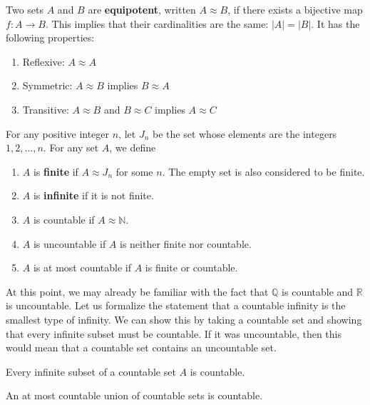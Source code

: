 \documentclass{article}
\begin{document}
    \begin{definition}[Equipotence]
    Two sets $A$ and $B$ are \textbf{equipotent}, written $A \approx B$, if there exists a bijective map $f: A \rightarrow B$. This implies that their cardinalities are the same: $|A| = |B|$. It has the following properties: 
    \begin{enumerate}
        \item Reflexive: $A \approx A$
        \item Symmetric: $A \approx B$ implies $B \approx A$
        \item Transitive: $A \approx B$ and $B \approx C$ implies $A \approx C$
    \end{enumerate}
    \end{definition}

    \begin{definition}
    For any positive integer $n$, let $J_n$ be the set whose elements are the integers $1, 2, \ldots, n$. For any set $A$, we define 
    \begin{enumerate}
        \item $A$ is \textbf{finite} if $A \approx J_n$ for some $n$. The empty set is also considered to be finite. 
        \item $A$ is \textbf{infinite} if it is not finite. 
        \item $A$ is countable if $A \approx \mathbb{N}$. 
        \item $A$ is uncountable if $A$ is neither finite nor countable. 
        \item $A$ is at most countable if $A$ is finite or countable. 
    \end{enumerate}
    \end{definition}

    At this point, we may already be familiar with the fact that $\mathbb{Q}$ is countable and $\mathbb{R}$ is uncountable. Let us formalize the statement that a countable infinity is the smallest type of infinity. We can show this by taking a countable set and showing that every infinite subset must be countable. If it was uncountable, then this would mean that a countable set contains an uncountable set. 

    \begin{theorem}
    \label{countable smallest}
    Every infinite subset of a countable set $A$ is countable. 
    \end{theorem}

    \begin{theorem}
    An at most countable union of countable sets is countable. 
    \end{theorem}
\end{document}
